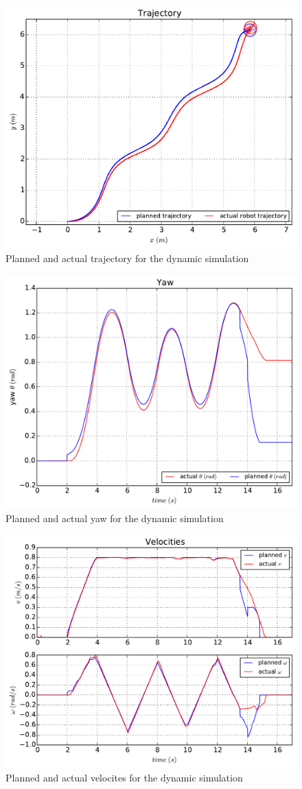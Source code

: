 \begin{figure}[H]\centering
  \includegraphics[width=.65\textwidth]{./images/xde/dy_path.pdf}
  \caption{Planned and actual trajectory for the dynamic simulation\label{fig:xdepath}}
\end{figure}
\begin{figure}[H]\centering
  \includegraphics[width=.65\textwidth]{./images/xde/ang.pdf}
  \caption{Planned and actual yaw for the dynamic simulation \label{fig:xdeang}}
\end{figure}
\begin{figure}[H]\centering
  \includegraphics[width=.65\textwidth]{./images/xde/dy_vw.pdf}
  \caption{Planned and actual velocites for the dynamic simulation\label{fig:xdevelo}}
\end{figure}


